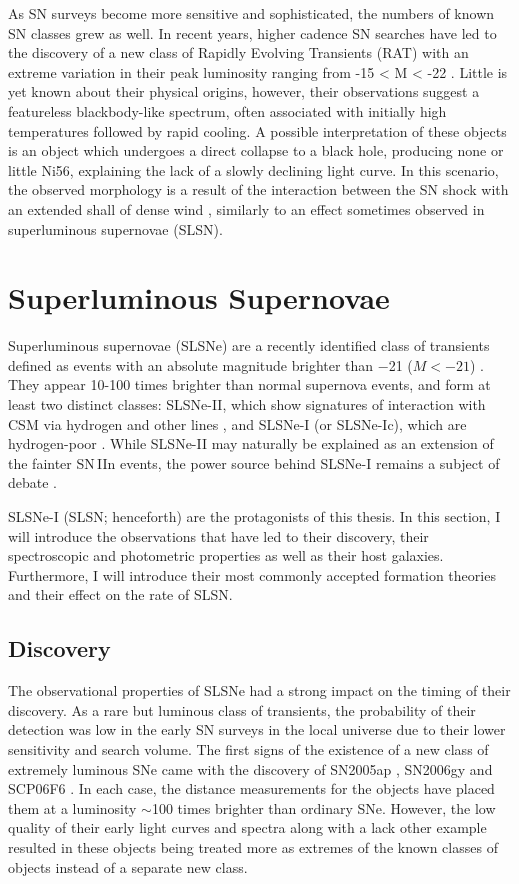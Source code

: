 As SN surveys become more sensitive and sophisticated, the numbers of known SN classes grew as well. In recent years, higher cadence SN searches have led to the discovery of a new class of Rapidly Evolving Transients (RAT) with an extreme variation in their peak luminosity ranging from -15 < M < -22 \citep{Pursiainen2018}. Little is yet known about their physical origins, however, their observations suggest a featureless blackbody-like spectrum, often associated with initially high temperatures followed by rapid cooling. A possible interpretation of these objects is an object which undergoes a direct collapse to a black hole, producing none or little Ni56, explaining the lack of a slowly declining light curve. In this scenario, the observed morphology is a result of the interaction between the SN shock with an extended shall of dense wind \citep{Piro2015}, similarly to an effect sometimes observed in superluminous supernovae (SLSN).

\section{Superluminous Supernovae}
Superluminous supernovae (SLSNe) are a recently identified class of transients defined as events with an absolute magnitude brighter than $-$21 ($M<-21$) \citep{Gal-Yam2012}. They appear 10-100 times brighter than normal supernova events, and form at least two distinct classes: SLSNe-II, which show signatures of interaction with CSM via hydrogen and other lines \citep{Ofek2006,Smith2006,Drake2011}, and SLSNe-I (or SLSNe-Ic), which are hydrogen-poor \citep{Quimby2011}. While SLSNe-II may naturally be explained as an extension of the fainter SN\,IIn events, the power source behind SLSNe-I remains a subject of debate \citep{Gal-Yam2012}.

SLSNe-I (SLSN; henceforth) are the protagonists of this thesis. In this section, I will introduce the observations that have led to their discovery, their spectroscopic and photometric properties as well as their host galaxies. Furthermore, I will introduce their most commonly accepted formation theories and their effect on the rate of SLSN.

\subsection{Discovery}
The observational properties of SLSNe had a strong impact on the timing of their discovery. As a rare but luminous class of transients, the probability of their detection was low in the early SN surveys in the local universe due to their lower sensitivity and search volume. The first signs of the existence of a new class of extremely luminous SNe came with the discovery of SN2005ap \citep{Quimby2007}, SN2006gy \citep{Ofek2007} and SCP06F6 \citep{Barbary2009}. In each case, the distance measurements for the objects have placed them at a luminosity $\sim$100 times brighter than ordinary SNe. However, the low quality of their early light curves and spectra along with a lack other example resulted in these objects being treated more as extremes of the known classes of objects instead of a separate new class.

